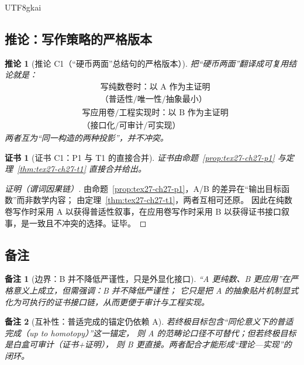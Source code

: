 \documentclass[12pt]{article}
\newtheorem{corollary}{推论}[section]
\newtheorem{remark}{备注}[section]
\newtheorem{Certificate}{证书}[section]
\begin{document}
\begin{CJK*}{UTF8}{gkai}
\subsection{推论：写作策略的严格版本}
\label{subsec:tex27-ch27-cor}

\begin{corollary}[推论 C1（“硬币两面”总结句的严格版本）]
\label{cor:tex27-ch27-c1}
把“硬币两面”翻译成可复用结论就是：
\[
  \boxed{\begin{aligned}
    &\text{写纯数卷时：以 A 作为主证明}\\
    &\text{（普适性/唯一性/抽象最小）}
  \end{aligned}}
\]
\[
  \boxed{\begin{aligned}
    &\text{写应用卷/工程实现时：以 B 作为主证明}\\
    &\text{（接口化/可审计/可实现）}
  \end{aligned}}
\]
两者互为“同一构造的两种投影”，并不冲突。
\end{corollary}

\begin{Certificate}[证书 C1：P1 与 T1 的直接合并]
\label{cert:tex27-ch27-c1}
证书由命题~\ref{prop:tex27-ch27-p1} 与定理~\ref{thm:tex27-ch27-t1} 直接合并给出。
\end{Certificate}

\begin{proof}[证明（谓词因果链）]
由命题~\ref{prop:tex27-ch27-p1}，A/B 的差异在“输出目标函数”而非数学内容；
由定理~\ref{thm:tex27-ch27-t1}，两者互相可还原。
因此在纯数卷写作时采用 A 以获得普适性叙事，在应用卷写作时采用 B 以获得证书接口叙事，是一致且不冲突的选择。证毕。
\end{proof}

\subsection{备注}
\label{subsec:tex27-ch27-remarks}

\begin{remark}[边界：B 并不降低严谨性，只是外显化接口]
“A 更纯数、B 更应用”在严格意义上成立，但需强调：B 并不降低严谨性；
它只是把 A 的抽象贴片机制显式化为可执行的证书接口链，从而更便于审计与工程实现。
\end{remark}

\begin{remark}[互补性：普适完成的锚定仍依赖 A]
若终极目标包含“同伦意义下的普适完成（up to homotopy）”这一锚定，
则 A 的范畴论口径不可替代；但若终极目标是白盒可审计（证书+证明），
则 B 更直接。两者配合才能形成“理论—实现”的闭环。
\end{remark}


\end{CJK*}
\end{document}
